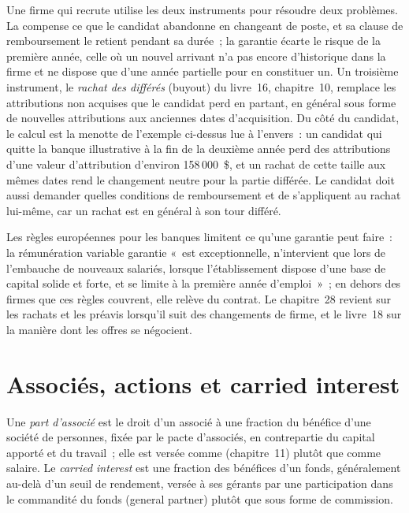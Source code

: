 Une firme qui recrute utilise les deux instruments pour résoudre deux problèmes. La  compense ce que le candidat abandonne en changeant
de poste, et sa clause de remboursement le retient pendant sa durée~; la garantie écarte le risque de la première année, celle où un nouvel
arrivant n'a pas encore d'historique dans la firme et ne dispose que d'une année partielle pour en constituer un. Un troisième instrument, le \emph{rachat des différés} (buyout) du livre~16,
chapitre~10, remplace les attributions non acquises que le candidat perd en partant, en général sous forme de nouvelles attributions aux anciennes
dates d'acquisition. Du côté du candidat, le calcul est la menotte de l'exemple ci-dessus lue à l'envers~: un candidat qui
quitte la banque illustrative à la fin de la deuxième année perd des attributions d'une valeur d'attribution d'environ 158\,000~\$, et un rachat
de cette taille aux mêmes dates rend le changement neutre pour la partie différée. Le candidat doit aussi demander quelles
conditions de remboursement et de  s'appliquent au rachat lui-même, car un rachat est en général à son tour différé.

Les règles européennes pour les banques limitent ce qu'une garantie peut faire~: la rémunération variable garantie «~est exceptionnelle,
n'intervient que lors de l'embauche de nouveaux salariés, lorsque l'établissement dispose d'une base de capital solide et forte, et se
limite à la première année d'emploi~»~; en dehors des firmes que ces règles couvrent, elle relève du contrat. Le chapitre~28 revient sur
les rachats et les préavis lorsqu'il suit des changements de firme, et le livre~18 sur la manière dont les offres se négocient.

\section{Associés, actions et carried interest}

\begin{definition}\label{def:in:how-pay-works:carry}
Une \emph{part d'associé} est le droit d'un associé à une fraction du bénéfice d'une société de personnes, fixée par
le pacte d'associés, en contrepartie du capital apporté et du travail~; elle est versée comme 
(chapitre~11) plutôt que comme salaire. Le \emph{carried interest} est une fraction des bénéfices d'un fonds,
généralement au-delà d'un seuil de rendement, versée à ses gérants par une participation dans le commandité du fonds (general partner) plutôt que sous forme de commission.
\end{definition}

